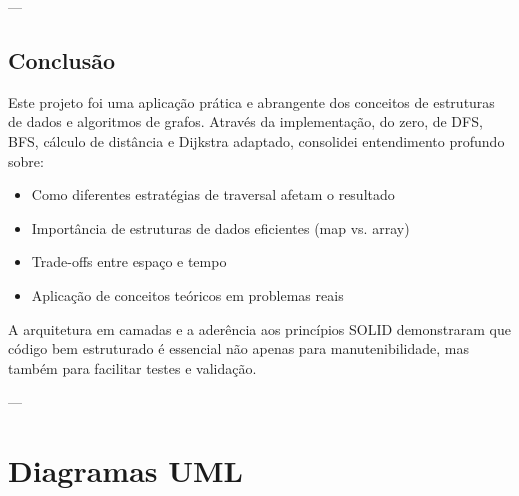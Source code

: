 \documentclass[12pt,openright,twoside,a4paper,english,brazilian,hidelinks]{abntex2}
\begin{document}
    ---

    \section{Conclusão}

    Este projeto foi uma aplicação prática e abrangente dos conceitos de estruturas de dados
    e algoritmos de grafos. Através da implementação, do zero, de DFS, BFS, cálculo de distância
    e Dijkstra adaptado, consolidei entendimento profundo sobre:

    \begin{itemize}
        \item Como diferentes estratégias de traversal afetam o resultado
        \item Importância de estruturas de dados eficientes (map vs. array)
        \item Trade-offs entre espaço e tempo
        \item Aplicação de conceitos teóricos em problemas reais
    \end{itemize}

    A arquitetura em camadas e a aderência aos princípios SOLID demonstraram que código bem
    estruturado é essencial não apenas para manutenibilidade, mas também para facilitar testes
    e validação.

    ---




    \appendix

    \chapter{Diagramas UML}
    \setcounter{figure}{0}
\end{document}
